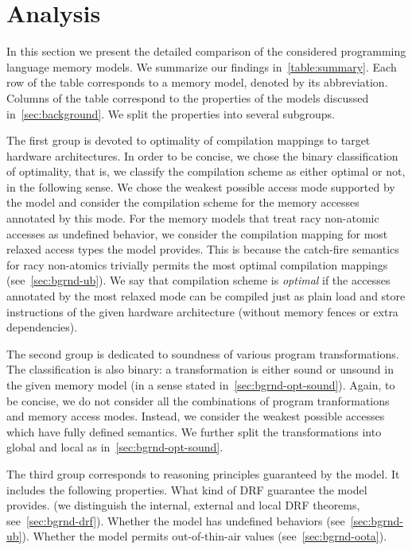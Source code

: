 \section{Analysis}

In this section we present the detailed comparison 
of the considered programming language memory models. 
We summarize our findings in~\cref{table:summary}.
Each row of the table corresponds to a memory model, denoted by its abbreviation. 
Columns of the table correspond to the properties of the models discussed in~\cref{sec:background}.
We split the properties into several subgroups. 

The first group is devoted to optimality of compilation mappings
to target hardware architectures. In order to be concise, 
we chose the binary classification of optimality, 
that is, we classify the compilation scheme as either optimal or not,
in the following sense.
We chose the weakest possible access mode supported by the model
and consider the compilation scheme for the memory accesses annotated by this mode. 
For the memory models that treat racy non-atomic accesses
as undefined behavior, we consider the compilation mapping
for most relaxed access types the model provides.
This is because the catch-fire semantics for racy non-atomics 
trivially permits the most optimal compilation mappings (see~\cref{sec:bgrnd-ub}).
We say that compilation scheme is \emph{optimal} if the 
accesses annotated by the most relaxed mode 
can be compiled just as plain load and store instructions 
of the given hardware architecture (\ie without memory fences or extra dependencies). 

The second group is dedicated to soundness of various program transformations. 
The classification is also binary: a transformation is either sound or unsound 
in the given memory model (in a sense stated in~\cref{sec:bgrnd-opt-sound}).
Again, to be concise, we do not consider all the combinations 
of program tranformations and memory access modes. 
Instead, we consider the weakest possible accesses which have fully defined semantics. 
We further split the transformations into global and local as in~\cref{sec:bgrnd-opt-sound}.

The third group corresponds to reasoning principles guaranteed by the model. 
It includes the following properties. What kind of DRF guarantee the model provides.
(we distinguish the internal, external and local DRF theorems, see~\cref{sec:bgrnd-drf}).
Whether the model has undefined behaviors (see~\cref{sec:bgrnd-ub}).
Whether the model permits out-of-thin-air values (see~\cref{sec:bgrnd-oota}).


